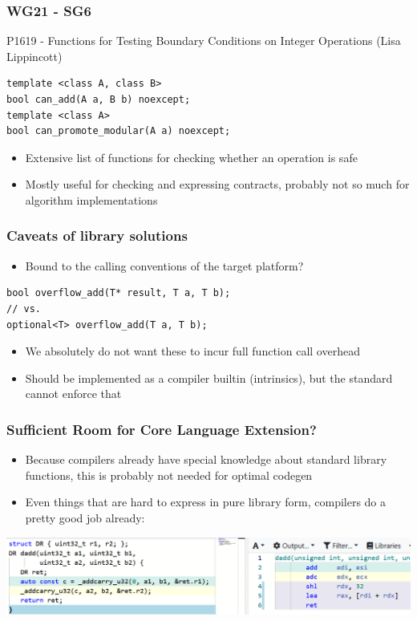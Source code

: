 \documentclass[aspectratio=169]{beamer}
\newif\iftransitions
\begin{document}
\begin{frame}[fragile]
  \frametitle{WG21 - SG6}
  
  P1619 - Functions for Testing Boundary Conditions on Integer Operations (Lisa Lippincott)
  
  \begin{lstlisting}
template <class A, class B>
bool can_add(A a, B b) noexcept;
template <class A>
bool can_promote_modular(A a) noexcept;
  \end{lstlisting}
  
  \begin{itemize}
  \item Extensive list of functions for checking whether an operation is safe  \iftransitions \pause \fi 
  \item Mostly useful for checking and expressing contracts, probably not so much for algorithm implementations
  \end{itemize}
\end{frame}

\begin{frame}[fragile]
  \frametitle{Caveats of library solutions}
  
  \begin{itemize}
    \item Bound to the calling conventions of the target platform?
  \end{itemize}
  \begin{lstlisting}
bool overflow_add(T* result, T a, T b);
// vs.
optional<T> overflow_add(T a, T b);
  \end{lstlisting}  \iftransitions \pause \fi 
  \begin{itemize}
    \item We absolutely do not want these to incur full function call overhead  \iftransitions \pause \fi
    \item Should be implemented as a compiler builtin (intrinsics), but the standard cannot enforce that
  \end{itemize}
\end{frame}

\begin{frame}
  \frametitle{Sufficient Room for Core Language Extension?}
  
  \iftransitions \pause \fi 
  \begin{itemize}
    \item Because compilers already have special knowledge about standard library functions, this is probably not needed for optimal codegen \iftransitions \pause \fi 
    \item Even things that are hard to express in pure library form, compilers do a pretty good job already:
  \end{itemize}
  \includegraphics[width=.95\textwidth]{arithgfx/double_add.png}
\end{frame}
\end{document}
